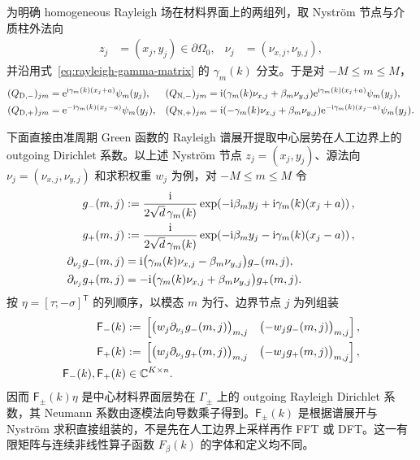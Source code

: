 为明确 homogeneous Rayleigh 场在材料界面上的两组列，取 Nystr\"om 节点与介质柱外法向
\begin{align*}
  z_j&=(x_j,y_j)\in\partial\Omega_0,
  &\nu_j&=(\nu_{x,j},\nu_{y,j}),
\end{align*}
并沿用式~\eqref{eq:rayleigh-gamma-matrix} 的 $\gamma_m(k)$ 分支。于是对 $-M\leq m\leq M$，
\begin{align}
  (Q_{\mathrm D,-})_{jm}
  &=\mathrm{e}^{\mathrm{i}\gamma_m(k)(x_j+a)}\psi_m(y_j),
  &
  (Q_{\mathrm N,-})_{jm}
  &=\mathrm{i}(\gamma_m(k)\nu_{x,j}+\beta_m\nu_{y,j})
    \mathrm{e}^{\mathrm{i}\gamma_m(k)(x_j+a)}\psi_m(y_j),
  \notag\\
  (Q_{\mathrm D,+})_{jm}
  &=\mathrm{e}^{-\mathrm{i}\gamma_m(k)(x_j-a)}\psi_m(y_j),
  &
  (Q_{\mathrm N,+})_{jm}
  &=\mathrm{i}(-\gamma_m(k)\nu_{x,j}+\beta_m\nu_{y,j})
    \mathrm{e}^{-\mathrm{i}\gamma_m(k)(x_j-a)}\psi_m(y_j).
  \label{eq:center-homogeneous-rayleigh-traces}
\end{align}

下面直接由准周期 Green 函数的 Rayleigh 谱展开提取中心层势在人工边界上的
outgoing Dirichlet 系数。以上述 Nystr\"om 节点 $z_j=(x_j,y_j)$、源法向
$\nu_j=(\nu_{x,j},\nu_{y,j})$ 和求积权重 $w_j$ 为例，对 $-M\leq m\leq M$ 令
\begin{align}
  g_-(m,j)
  &:=\frac{\mathrm{i}}{2\sqrt{d}\,\gamma_m(k)}
  \exp\!\left(
    -\mathrm{i}\beta_m y_j+\mathrm{i}\gamma_m(k)(x_j+a)
  \right),
  \notag\\
  g_+(m,j)
  &:=\frac{\mathrm{i}}{2\sqrt{d}\,\gamma_m(k)}
  \exp\!\left(
    -\mathrm{i}\beta_m y_j-\mathrm{i}\gamma_m(k)(x_j-a)
  \right),
  \label{eq:center-farfield-kernels}\\
  \partial_{\nu_j}g_-(m,j)
  &=\mathrm{i}\bigl(\gamma_m(k)\nu_{x,j}-\beta_m\nu_{y,j}\bigr)g_-(m,j),
  \notag\\
  \partial_{\nu_j}g_+(m,j)
  &=-\mathrm{i}\bigl(\gamma_m(k)\nu_{x,j}+\beta_m\nu_{y,j}\bigr)g_+(m,j).
  \label{eq:center-farfield-normal-factors}
\end{align}
按 $\eta=[\tau;-\sigma]^{\mathsf T}$ 的列顺序，以模态 $m$ 为行、边界节点 $j$ 为列组装
\begin{align}
  \mathsf F_-(k)
  &:={}
  \left[
    \bigl(w_j\partial_{\nu_j}g_-(m,j)\bigr)_{m,j}
    \quad
    \bigl(-w_jg_-(m,j)\bigr)_{m,j}
  \right],
  \notag\\
  \mathsf F_+(k)
  &:={}
  \left[
    \bigl(w_j\partial_{\nu_j}g_+(m,j)\bigr)_{m,j}
    \quad
    \bigl(-w_jg_+(m,j)\bigr)_{m,j}
  \right],
  \notag\\
  \mathsf F_-(k),\mathsf F_+(k)
  &\in\mathbb{C}^{K\times n}.
  \label{eq:center-farfield-extractors}
\end{align}
因而 $\mathsf F_\pm(k)\eta$ 是中心材料界面层势在 $\Gamma_\pm$ 上的 outgoing Rayleigh
Dirichlet 系数，其 Neumann 系数由逐模法向导数乘子得到。$\mathsf F_\pm(k)$ 是根据谱展开与
Nystr\"om 求积直接组装的，不是先在人工边界上采样再作 FFT 或 DFT。这一有限矩阵与连续非线性算子函数
$F_\beta(k)$ 的字体和定义均不同。

